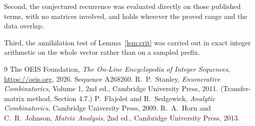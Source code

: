 \documentclass[11pt,a4paper]{article}
\theoremstyle{plain}
\theoremstyle{definition}
\begin{document}
Second, the conjectured recurrence was evaluated directly on those published terms, with no
matrices involved, and holds wherever the proved range and the data overlap.

Third, the annihilation test of Lemma~\ref{lem:crit} was carried out in exact integer
arithmetic on the whole vector rather than on a sampled prefix.

\begin{thebibliography}{9}
 The OEIS Foundation, \emph{The On-Line Encyclopedia of Integer
Sequences}, \url{https://oeis.org}, 2026. Sequence A268260.
 R.~P.~Stanley, \emph{Enumerative Combinatorics}, Volume 1, 2nd ed.,
Cambridge University Press, 2011. (Transfer-matrix method, Section 4.7.)
 P.~Flajolet and R.~Sedgewick, \emph{Analytic Combinatorics}, Cambridge
University Press, 2009.
 R.~A.~Horn and C.~R.~Johnson, \emph{Matrix Analysis}, 2nd ed., Cambridge
University Press, 2013.
\end{thebibliography}
\end{document}

